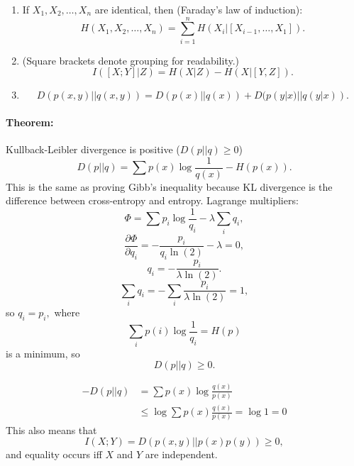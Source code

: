 \documentclass[12pt]{article}
\begin{document}
\begin{figure}[h]
\centering
{}
\end{figure}
\begin{enumerate}
\item If $X_1,X_2,\dots,X_n$ are identical, then (Faraday's law of induction):
\[H(X_1,X_2,\dots,X_n)=\sum_{i=1}^n H(X_i\big|[X_{i-1},\dots,X_1]).\]

\item (Square brackets denote grouping for readability.)
\[I([X;Y]\big|Z)=H(X\big|Z)-H(X\big|[Y,Z]).\]
\item
\[D(p(x,y)||q(x,y))=D(p(x)||q(x))+D(p(y|x)||q(y|x)).\]

\end{enumerate}

\paragraph{Theorem:} Kullback-Leibler divergence is positive ($D(p||q)\ge0$)
\[D(p||q)=\sum p(x)\log\frac{1}{q(x)}-H(p(x)).\]
This is the same as proving Gibb's inequality because KL divergence is the difference between cross-entropy and entropy. Lagrange multipliers:
\[\Phi=\sum p_i\log\frac{1}{q_i}-\lambda\sum_i q_i,\]
\[\frac{\partial\Phi}{\partial q_i}=-\frac{p_i}{q_i\ln(2)}-\lambda=0,\]
\[q_i=-\frac{p_i}{\lambda\ln(2)}.\]
\[\sum_{i}q_i=-\sum_i\frac{p_i}{\lambda\ln(2)}=1,\]
so $q_i=p_i,$ where
\[\sum_i p(i)\log\frac{1}{q_i}=H(p)\] is a minimum,
so 
\[D(p||q)\ge 0.\]

\begin{align*}
    -D(p||q) &= \sum p(x) \log \frac{q(x)}{p(x)} \\
    &\le \log \sum p(x) \frac{q(x)}{p(x)} = \log 1 = 0
\end{align*}
This also means that \[I(X;Y)=D(p(x,y)||p(x)p(y))\ge 0,\] and equality occurs iff $X$ and $Y$ are independent. 
\end{document}
